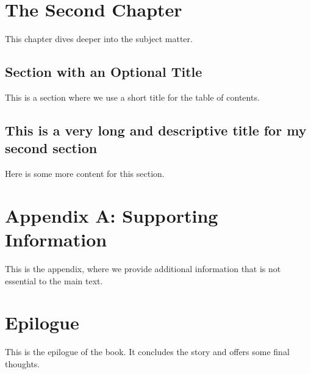 \documentclass{book}
\begin{document}
\chapter{The Second Chapter}
This chapter dives deeper into the subject matter.

\section{Section with an Optional Title}
This is a section where we use a short title for the table of contents.
\section[Short Title]{This is a very long and descriptive title for my second section}
Here is some more content for this section.

\appendix
\chapter{Appendix A: Supporting Information}
This is the appendix, where we provide additional information that is not essential to the main text.

\backmatter
\chapter*{Epilogue}
This is the epilogue of the book. It concludes the story and offers some final thoughts.

\end{document}

